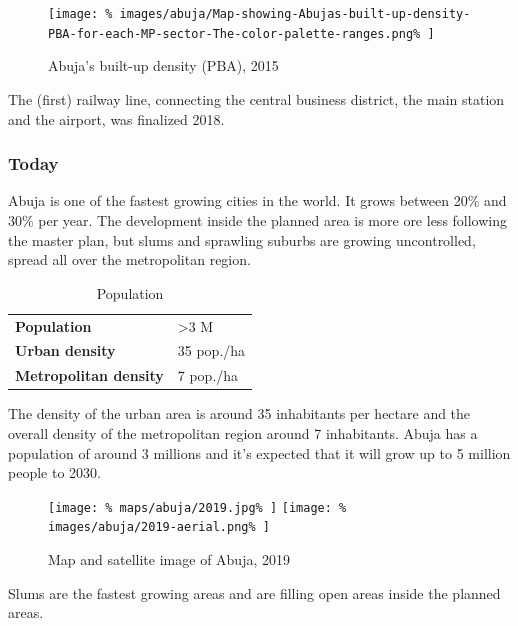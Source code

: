 \documentclass[twocolumn]{article}
\begin{document}
			\begin{figure}[H]
				\texttt{[image: \%
					images/abuja/Map-showing-Abujas-built-up-density-PBA-for-each-MP-sector-The-color-palette-ranges.png\%
				]}
				\caption{Abuja's built-up density (PBA), 2015\cite{ResearchGate:AbujaDensity}}
				\label{fig:images:abuja-density}
			\end{figure}
			
			The (first) railway line, connecting the central business district, the main station and the airport, was finalized 2018.
			
			
			\subsubsection{Today}
			
			Abuja is one of the fastest growing cities in the world. It grows between 20\% and 30\% per year. The development inside the planned area is more ore less following the master plan, but slums and sprawling suburbs are growing uncontrolled, spread all over the metropolitan region.
			
			\begin{table}[H]			
				\centering
				\caption{Population}
				\label{table:abuja-population}
				\begin{tabular}{|l|l|}
					\hline
					\textbf{Population}           & \textgreater 3 M \\
					\textbf{Urban density}        & 35 pop./ha \\
					\textbf{Metropolitan density} & 7 pop./ha \\
					\hline
				\end{tabular}
			\end{table}
			
			The density of the urban area is around 35 inhabitants per hectare and the overall density of the metropolitan region around 7 inhabitants.
			Abuja has a population of around 3 millions and it's expected that it will grow up to 5 million people to 2030.
			
			\begin{figure}[H]			
				\texttt{[image: \%
					maps/abuja/2019.jpg\%
				]}
				\texttt{[image: \%
					images/abuja/2019-aerial.png\%
				]}
				\caption{Map\cite{OpenStreetMap:Abuja} and satellite image\cite{Satellites.pro:Abuja} of Abuja, 2019}
				\label{fig:map:abuja-map-satellite-2019}
			\end{figure}
			
			Slums are the fastest growing areas and are  filling open areas inside the planned areas.
			
\end{document}
